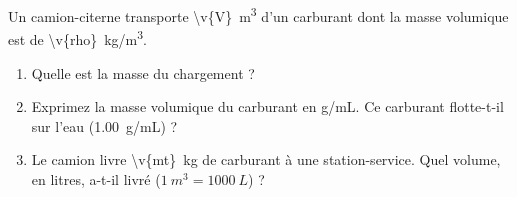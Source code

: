 Un camion-citerne transporte \qty{\v{V}}{m^3} d'un carburant dont la masse volumique est de \qty{\v{rho}}{kg/m^3}.

\begin{enumerate}[label=\alph*)]
    \item Quelle est la masse du chargement ?
    \item Exprimez la masse volumique du carburant en g/mL. Ce carburant flotte-t-il sur l'eau (\qty{1.00}{g/mL}) ?
    \item Le camion livre \qty{\v{mt}}{kg} de carburant à une station-service. Quel volume, en litres, a-t-il livré ($\qty{1}{m^3} = \qty{1000}{L}$) ?
\end{enumerate}
